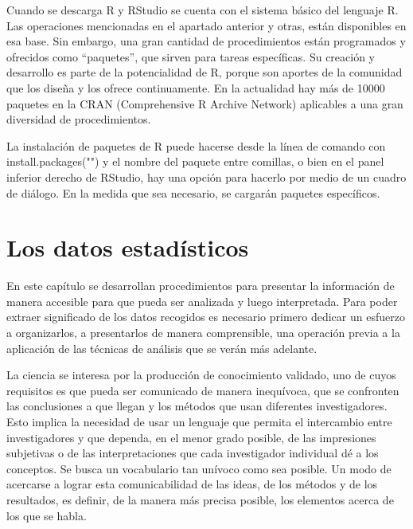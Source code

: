 \documentclass[]{book}
\begin{document}
Cuando se descarga R y RStudio se cuenta con el sistema básico del lenguaje R. Las operaciones mencionadas en el apartado anterior y otras, están disponibles en esa base. Sin embargo, una gran cantidad de procedimientos están programados y ofrecidos como ``paquetes'', que sirven para tareas específicas. Su creación y desarrollo es parte de la potencialidad de R, porque son aportes de la comunidad que los diseña y los ofrece continuamente. En la actualidad hay más de 10000 paquetes en la CRAN (Comprehensive R Archive Network) aplicables a una gran diversidad de procedimientos.

La instalación de paquetes de R puede hacerse desde la línea de comando con install.packages("") y el nombre del paquete entre comillas, o bien en el panel inferior derecho de RStudio, hay una opción para hacerlo por medio de un cuadro de diálogo. En la medida que sea necesario, se cargarán paquetes específicos.

\hypertarget{los-datos-estaduxedsticos}{%
\chapter{Los datos estadísticos}\label{los-datos-estaduxedsticos}}

En este capítulo se desarrollan procedimientos para presentar la información de manera accesible para que pueda ser analizada y luego interpretada. Para poder extraer significado de los datos recogidos es necesario primero dedicar un esfuerzo a organizarlos, a presentarlos de manera comprensible, una operación previa a la aplicación de las técnicas de análisis que se verán más adelante.

La ciencia se interesa por la producción de conocimiento validado, uno de cuyos requisitos es que pueda ser comunicado de manera inequívoca, que se confronten las conclusiones a que llegan y los métodos que usan diferentes investigadores. Esto implica la necesidad de usar un lenguaje que permita el intercambio entre investigadores y que dependa, en el menor grado posible, de las impresiones subjetivas o de las interpretaciones que cada investigador individual dé a los conceptos. Se busca un vocabulario tan unívoco como sea posible. Un modo de acercarse a lograr esta comunicabilidad de las ideas, de los métodos y de los resultados, es definir, de la manera más precisa posible, los elementos acerca de los que se habla.
\end{document}
